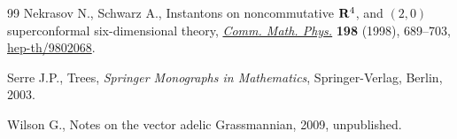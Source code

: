 \documentclass[11pt]{article}
\begin{document}
\begin{thebibliography}{99}
Nekrasov N., Schwarz A., Instantons on noncommutative {${\bf R}^4$}, and
  {$(2,0)$} superconformal six-dimensional theory, \href{http://dx.doi.org/10.1007/s002200050490}{\textit{Comm. Math. Phys.}}
  \textbf{198} (1998), 689--703, \href{http://arxiv.org/abs/hep-th/9802068}{hep-th/9802068}.

Serre J.P., Trees, \textit{Springer Monographs in Mathematics}, Springer-Verlag, Berlin,
  2003.

Wilson G., Notes on the vector adelic {G}rassmannian, 2009, unpublished.

\end{thebibliography}
\end{document}
